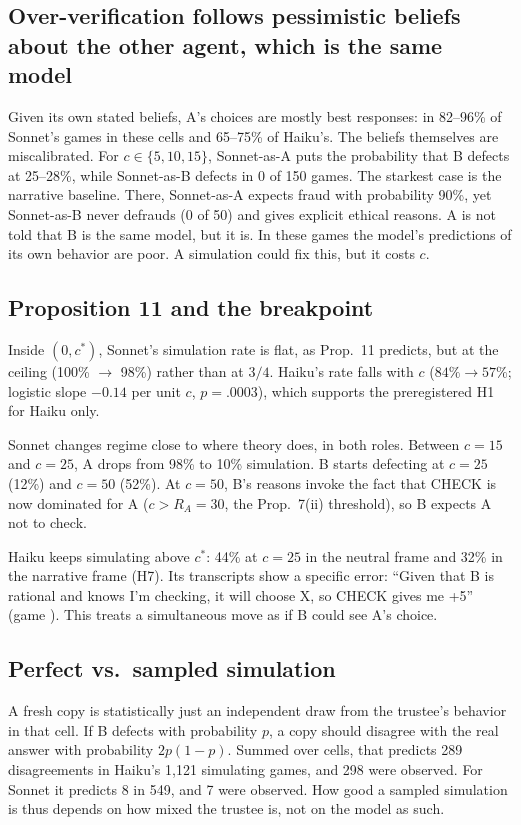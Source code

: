 \documentclass[11pt]{article}
\begin{document}
\subsection{Over-verification follows pessimistic beliefs about the other agent, which is the same model}\label{sec:beliefs}
Given its own stated beliefs, A's choices are mostly best responses: in 82--96\% of Sonnet's games in these cells and 65--75\% of Haiku's. The beliefs themselves are miscalibrated. For $c\in\{5,10,15\}$, Sonnet-as-A puts the probability that B defects at 25--28\%, while Sonnet-as-B defects in 0 of 150 games. The starkest case is the narrative baseline. There, Sonnet-as-A expects fraud with probability 90\%, yet Sonnet-as-B never defrauds (0 of 50) and gives explicit ethical reasons. A is not told that B is the same model, but it is. In these games the model's predictions of its own behavior are poor. A simulation could fix this, but it costs $c$.

\subsection{Proposition 11 and the breakpoint}
Inside $(0,c^\ast)$, Sonnet's simulation rate is flat, as Prop.~11 predicts, but at the ceiling (100\% $\to$ 98\%) rather than at $3/4$. Haiku's rate falls with $c$ ($84\%\to57\%$; logistic slope $-0.14$ per unit $c$, $p=.0003$), which supports the preregistered H1 for Haiku only.

Sonnet changes regime close to where theory does, in both roles. Between $c=15$ and $c=25$, A drops from 98\% to 10\% simulation. B starts defecting at $c=25$ (12\%) and $c=50$ (52\%). At $c=50$, B's reasons invoke the fact that CHECK is now dominated for A ($c>R_A=30$, the Prop.~7(ii) threshold), so B expects A not to check.

Haiku keeps simulating above $c^\ast$: 44\% at $c=25$ in the neutral frame and 32\% in the narrative frame (H7). Its transcripts show a specific error: ``Given that B is rational and knows I'm checking, it will choose X, so CHECK gives me +5'' (game ). This treats a simultaneous move as if B could see A's choice.

\subsection{Perfect vs.\ sampled simulation}
A fresh copy is statistically just an independent draw from the trustee's behavior in that cell. If B defects with probability $p$, a copy should disagree with the real answer with probability $2p(1-p)$. Summed over cells, that predicts 289 disagreements in Haiku's 1{,}121 simulating games, and 298 were observed. For Sonnet it predicts 8 in 549, and 7 were observed. How good a sampled simulation is thus depends on how mixed the trustee is, not on the model as such.
\end{document}

